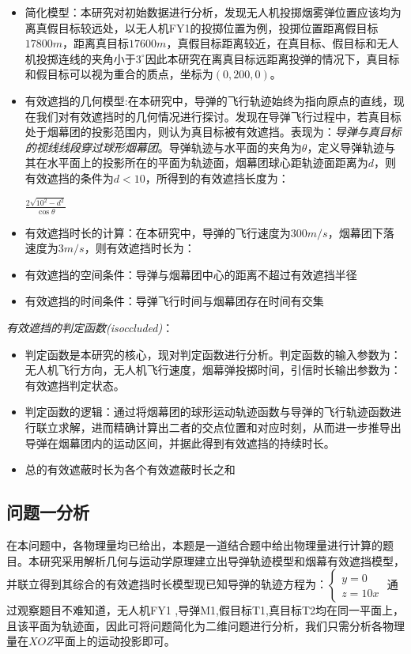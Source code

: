 \documentclass{article}
\begin{document}
\begin{itemize}
    \item 简化模型：本研究对初始数据进行分析，发现无人机投掷烟雾弹位置应该均为离真假目标较远处，以无人机FY1的投掷位置为例，投掷位置距离假目标$17800m$，距离真目标$17600m$，真假目标距离较近，在真目标、假目标和无人机投掷连线的夹角小于$3^\circ$因此本研究在离真目标远距离投弹的情况下，真目标和假目标可以视为重合的质点，坐标为$(0,200,0)$。
    \item 有效遮挡的几何模型:在本研究中，导弹的飞行轨迹始终为指向原点的直线，现在我们对有效遮挡时的几何情况进行探讨。发现在导弹飞行过程中，若真目标处于烟幕团的投影范围内，则认为真目标被有效遮挡。表现为：\textit{导弹与真目标的视线线段穿过球形烟幕团}。导弹轨迹与水平面的夹角为$\theta$，定义导弹轨迹与其在水平面上的投影所在的平面为轨迹面，烟幕团球心距轨迹面距离为$d$，则有效遮挡的条件为$d<10$，所得到的有效遮挡长度为：
    \begin{center}
        $\displaystyle \frac{2\sqrt{10^2-d^2}}{\cos\theta}$
    \end{center}
    \item 有效遮挡时长的计算：在本研究中，导弹的飞行速度为$300m/s$，烟幕团下落速度为$3m/s$，则有效遮挡时长为：
    \item 有效遮挡的空间条件：导弹与烟幕团中心的距离不超过有效遮挡半径
    \item 有效遮挡的时间条件：导弹飞行时间与烟幕团存在时间有交集
\end{itemize}

\textit{有效遮挡的判定函数(isoccluded)}：
\begin{itemize}
    \item 判定函数是本研究的核心，现对判定函数进行分析。判定函数的输入参数为：无人机飞行方向，无人机飞行速度，烟幕弹投掷时间，引信时长输出参数为：有效遮挡判定状态。
    \item 判定函数的逻辑：通过将烟幕团的球形运动轨迹函数与导弹的飞行轨迹函数进行联立求解，进而精确计算出二者的交点位置和对应时刻，从而进一步推导出导弹在烟幕团内的运动区间，并据此得到有效遮挡的持续时长。
    \item 总的有效遮蔽时长为各个有效遮蔽时长之和
\end{itemize}
\subsection{问题一分析}
在本问题中，各物理量均已给出，本题是一道结合题中给出物理量进行计算的题目。本研究采用解析几何与运动学原理建立出导弹轨迹模型和烟幕有效遮挡模型，并联立得到其综合的有效遮挡时长模型现已知导弹的轨迹方程为：$\begin{cases}
    y = 0 \\
    z = 10x
\end{cases}$
通过观察题目不难知道，无人机FY1 ,导弹M1,假目标T1,真目标T2均在同一平面上，且该平面为轨迹面，因此可将问题简化为二维问题进行分析，我们只需分析各物理量在$XOZ$平面上的运动投影即可。
\end{document}

